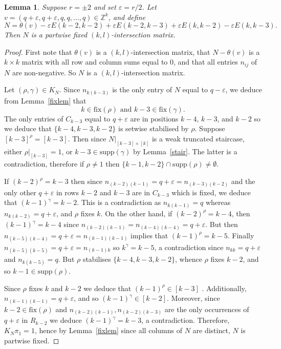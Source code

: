 \documentclass{daj}
\newcommand\fix{\mathrm{fix}}
\newcommand\supp{\mathrm{supp}}
\newcommand\Z{\mathbb{Z}}
\theoremstyle{plain}
\newtheorem{lemma}[theorem]{Lemma}
\theoremstyle{definition}
\begin{document}
\begin{lemma}\label{bestmat2}
Suppose $r=\pm2$ and set $\varepsilon=r/2$. Let $v=(q+\varepsilon,q+\varepsilon,q,q,\dots,q)\in \Z^k$, and define $$N=\theta(v)-\varepsilon E(k-2,k-2)+\varepsilon E(k-2,k-3)+\varepsilon E(k,k-2)-\varepsilon E(k,k-3).$$ Then $N$ is a partwise fixed $(k,l)$-intersection matrix.
\end{lemma}
\begin{proof}
First note that $\theta(v)$ is a $(k,l)$-intersection matrix, that $N-\theta(v)$ is a $k\times k$ matrix with all row and column sums equal to 0, and that all entries $n_{ij}$ of $N$ are non-negative. So $N$ is a $(k,l)$-intersection matrix. 

Let $(\rho,\gamma)\in K_N$. Since $n_{k(k-3)}$ is the only entry of $N$ equal to $q-\varepsilon$, we deduce from Lemma~\ref{fixlem} that $$k\in\fix(\rho) \text{ and } k-3\in\fix(\gamma).$$ The only entries of $C_{k-3}$ equal to $q+\varepsilon$ are in positions $k-4$, $k-3$, and $k-2$ so we deduce that $\{k-4,k-3,k-2\}$ is setwise stabilised by $\rho$. Suppose $[k-3]^{\rho}=[k-3]$. Then since $N|_{[k-3]\times[k]}$ is a weak truncated staircase, either $\rho|_{[k-3]}=1$, or $k-3\in\mathrm{supp}(\gamma)$ by Lemma~\ref{stair}. The latter is a contradiction, therefore if $\rho\ne1$ then $\{k-1,k-2\}\cap\mathrm{supp}(\rho)\ne\emptyset.$

 If $(k-2)^\rho= k-3$ then since $n_{(k-2)(k-1)}=q+\varepsilon=n_{(k-3)(k-2)}$ and the only other $q+\varepsilon$ in rows $k-2$ and $k-3$ are in $C_{k-3}$ which is fixed, we deduce that $(k-1)^\gamma= k-2$. This is a contradiction as $n_{k(k-1)}=q$ whereas $n_{k(k-2)}=q+\varepsilon$, and $\rho$ fixes $k$. On the other hand, if $(k-2)^\rho = k-4$, then $(k-1)^\gamma =k-4$ since $n_{(k-2)(k-1)}=n_{(k-4)(k-4)}=q+\varepsilon$. But then $n_{(k-5)(k-4)}=q+\varepsilon=n_{(k-1)(k-1)}$ implies that $(k-1)^\rho= k-5$. Finally $n_{(k-5)(k-5)}=q+\varepsilon=n_{(k-1)k}$ so $k^\gamma = k-5$, a contradiction since $n_{kk}=q+\varepsilon$ and $n_{k(k-5)}=q$. But $\rho$ stabilises $\{k-4,k-3,k-2\}$, whence $\rho$ fixes $k-2$, and so $k-1\in \supp(\rho)$.

Since $\rho$ fixes $k$ and $k-2$ we deduce that $(k-1)^\rho\in[k-3]$ . Additionally, $n_{(k-1)(k-1)}=q+\varepsilon$, and so $(k-1)^\gamma\in[k-2]$. 
Moreover, since $k-2\in\fix(\rho)$ and $n_{(k-2)(k-1)},n_{(k-2)(k-3)}$ are the only occurrences of $q+\varepsilon$ in $R_{k-2}$ we deduce $(k-1)^\gamma = k-3$, a contradiction. Therefore, $K_N\pi_1=1$, hence by Lemma~\ref{fixlem} since all columns of $N$ are distinct, $N$ is partwise fixed. 
\end{proof}
\end{document}
